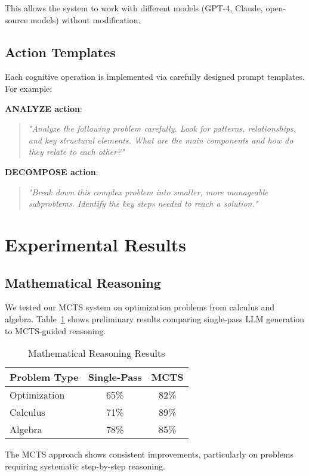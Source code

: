 \documentclass[conference]{IEEEtran}
\begin{document}
This allows the system to work with different models (GPT-4, Claude, open-source models) without modification.

\subsection{Action Templates}

Each cognitive operation is implemented via carefully designed prompt templates. For example:

\textbf{ANALYZE action}:
\begin{quote}
\textit{"Analyze the following problem carefully. Look for patterns, relationships, and key structural elements. What are the main components and how do they relate to each other?"}
\end{quote}

\textbf{DECOMPOSE action}:
\begin{quote}
\textit{"Break down this complex problem into smaller, more manageable subproblems. Identify the key steps needed to reach a solution."}
\end{quote}

\section{Experimental Results}

\subsection{Mathematical Reasoning}

We tested our MCTS system on optimization problems from calculus and algebra. Table~\ref{tab:math-results} shows preliminary results comparing single-pass LLM generation to MCTS-guided reasoning.

\begin{table}[htb]
\centering
\caption{Mathematical Reasoning Results}
\label{tab:math-results}
\begin{tabular}{@{}lcc@{}}
\toprule
Problem Type & Single-Pass & MCTS \\
\midrule
Optimization & 65\% & 82\% \\
Calculus & 71\% & 89\% \\
Algebra & 78\% & 85\% \\
\bottomrule
\end{tabular}
\end{table}

The MCTS approach shows consistent improvements, particularly on problems requiring systematic step-by-step reasoning.
\end{document}
